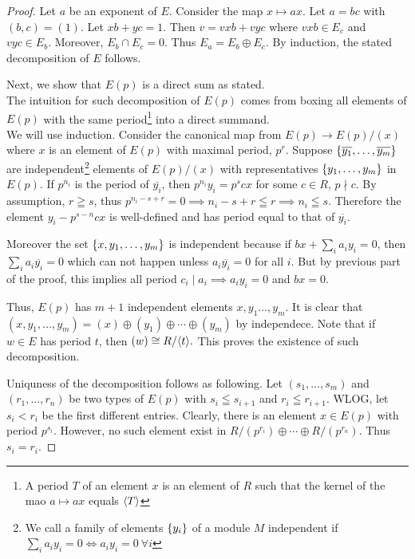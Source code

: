     \begin{proof}
        Let $a$ be an exponent of $E$. Consider the map $x \mapsto ax.$ Let $a = bc$ with $(b,c) = (1)$. Let $xb + yc = 1$. Then $v = vxb + vyc$ where $vxb \in E_c$ and $vyc \in E_b$. Moreover, $E_b \cap E_c = 0.$ Thus $E_a = E_b \oplus E_c.$ By induction, the stated decomposition of $E$ follows. 

        Next, we show that $E(p)$ is a direct sum as stated. 
        \\\horline The intuition for such decomposition of $E(p)$ comes from boxing all elements of $E(p)$ with the same period\footnote{A period $T$ of an element $x$ is an element of $R$ such that the kernel of the mao $a \mapsto ax $ equals $\langle T \rangle$} into a direct summand.\\
        \horline
        We will use induction. Consider the canonical map from $E(p) \to E(p)/(x)$ where $x$ is an element of $E(p)$ with maximal period, $p^r$. Suppose $\{\overline{y_1}, \dots, \overline{y_m}\}$ are independent\footnote{We call a family of elements $\{y_i\}$ of a module $M$ independent if $\sum_i a_iy_i = 0 \iff a_iy_i = 0\ \forall i$} elements of $E(p)/(x)$ with representatives $\{y_1,  \dots, y_m\}$ in $E(p)$. If $p^{n_i}$ is the period of $\overline{y_i}$, then $p^{n_i}y_i = p^scx$ for some $c \in R$, $p \nmid c.$ By assumption, $r \geqq s$, thus $p^{n_i - s  + r} = 0 \implies n_i - s + r \leqq r \implies n_i \leqq s.$ Therefore the element $y_i - p^{s - n}cx$ is well-defined and has period equal to that of $\overline{y_i}.$

        Moreover the set $\{x, y_1, \dots, y_m\}$ is independent because if $bx + \sum_ia_iy_i  = 0$, then $\sum_i a_i\overline{y_i} = 0$ which can not happen unless $a_i\overline{y_i} = 0$ for all $i$. But by previous part of the proof, this implies all period $c_i \mid a_i \implies a_iy_i = 0$ and $bx = 0.$  
        
        Thus, $E(p)$ has $m+1$ independent elements $x, y_1 \dots, y_m$. It is clear that $(x, y_1, \dots, y_m) = (x)\oplus(y_1)\oplus\cdots\oplus(y_m)$ by independece. Note that if $w \in E$ has period $t$, then $(w) \cong R/\langle t \rangle.$ This proves the existence of such decomposition.

        Uniquness of the decomposition follows as following. Let $(s_1, \dots, s_m)$ and $(r_1, \dots, r_n)$ be two types of $E(p)$ with $s_i \leqq s_{i+1}$ and $r_i \leqq r_{i+1}$. WLOG, let $s_i < r_i$ be the first different entries. Clearly, there is an element $x \in E(p)$ with period $p^{s_i}$. However, no such element exist in $R/(p^{r_{i}}) \oplus \cdots \oplus R/(p^{r_n}).$ Thus $s_i = r_i$.   
    \end{proof}


